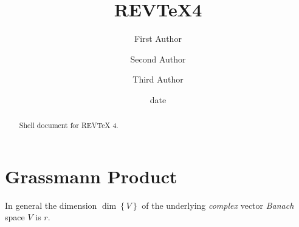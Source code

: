\documentclass[aps,preprint]{revtex4}%
\begin{document}
\title[Short title for running header]{REV\TeX4}
\author{First Author}
\author{Second Author}
\author{Third Author}

\begin{abstract}
Shell document for REV\TeX{} 4.

\end{abstract}
\date[Date text]{date}




\maketitle
\tableofcontents


\section{Grassmann Product}

In general the dimension $\dim\left\{  V\right\}  $ of the underlying
\emph{complex} vector \emph{Banach} space $V$ is $r.$
\end{document}
